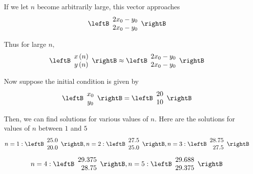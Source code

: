 \begin{solution}
If we let $n$ become arbitrarily large, this vector approaches 
\begin{equation*}
\leftB
\begin{array}{c}
2x_{0}-y_{0} \\
2x_{0}-y_{0}
\end{array}
\rightB 
\end{equation*}

Thus for large $n,$
\begin{equation*}
\leftB
\begin{array}{c}
x\left( n\right) \\
y\left( n\right)
\end{array}
\rightB \approx \leftB
\begin{array}{c}
2x_{0}-y_{0} \\
2x_{0}-y_{0}
\end{array}
\rightB
\end{equation*}

Now suppose the initial condition is given by 
\begin{equation*}
\leftB
\begin{array}{c}
x_{0} \\
y_{0}
\end{array}
\rightB
=
\leftB
\begin{array}{r}
20 \\
10
\end{array}
\rightB
\end{equation*}

Then, we can find solutions for various values of $n$. Here are the
solutions for values of $n$ between $1$ and $5$
\begin{equation*}
n=1:
\leftB
\begin{array}{r}
25.0 \\
20.0
\end{array}
\rightB,
n=2: \leftB
\begin{array}{r}
27.5 \\
25.0
\end{array}
\rightB,
n=3: \leftB
\begin{array}{r}
28.75 \\
27.5
\end{array}
\rightB
\end{equation*}
\begin{equation*}
n=4: \leftB
\begin{array}{r}
29.375 \\
28.75
\end{array}
\rightB,
n=5: \leftB
\begin{array}{r}
29.688 \\
29.375
\end{array}
\rightB
\end{equation*}


\end{solution}
